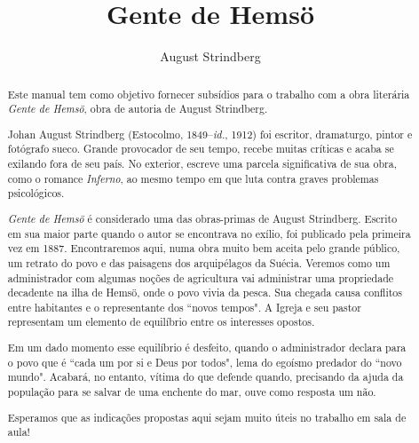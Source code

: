 \documentclass[12pt]{extarticle}
\begin{document}

\newcommand{\AutorLivro}{August Strindberg}
\newcommand{\TituloLivro}{Gente de Hemsö}
\newcommand{\Tema}{Ficção, mistério e fantasia}
\newcommand{\Genero}{Romance}
\newcommand{\imagemCapa}{./images/PNLD0039-01.png}
\newcommand{\issnppub}{---}
\newcommand{\issnepub}{---}
\newcommand{\colaborador}{Bruno Gradella e Vicente Castro} 


\title{\TituloLivro}
\author{\AutorLivro}
\def\authornotes{\colaborador}

\date{}
\maketitle

\baselineskip\par

\begin{abstract}
Este manual tem como objetivo fornecer subsídios para o trabalho com a
obra literária \emph{Gente de Hemsö}, obra de autoria de August
Strindberg.

Johan August Strindberg (Estocolmo, 1849--\textit{id.}, 1912) 
foi escritor, dramaturgo, pintor e fotógrafo sueco. Grande provocador
de seu tempo, recebe muitas críticas e acaba se exilando fora de 
seu país. No exterior, escreve uma parcela significativa de sua obra,
como o romance \textit{Inferno}, ao mesmo tempo em que luta contra graves 
problemas psicológicos.

\textit{Gente de Hemsö} é considerado uma das obras-primas de August 
Strindberg. Escrito em sua maior parte quando o autor se encontrava no 
exílio, foi publicado pela primeira vez em 1887. Encontraremos aqui, 
numa obra muito bem aceita pelo grande público, um retrato do povo e das 
paisagens dos arquipélagos da Suécia. Veremos como um administrador com 
algumas noções de agricultura vai administrar uma propriedade decadente 
na ilha de Hemsö, onde o povo vivia da pesca. Sua chegada causa 
conflitos entre habitantes e o representante dos ``novos tempos". A Igreja 
e seu pastor representam um elemento de equilíbrio entre os interesses 
opostos.

Em um dado momento esse equilíbrio é desfeito, quando o administrador 
declara para o povo que é ``cada um por si e Deus por todos", lema do 
egoísmo predador do ``novo mundo". Acabará, no entanto, vítima do que 
defende quando, precisando da ajuda da população para se salvar de uma 
enchente do mar, ouve como resposta um não.

Esperamos que as indicações propostas aqui sejam muito úteis no trabalho 
em sala de aula! 
\end{abstract}
\pagebreak
\end{document}
